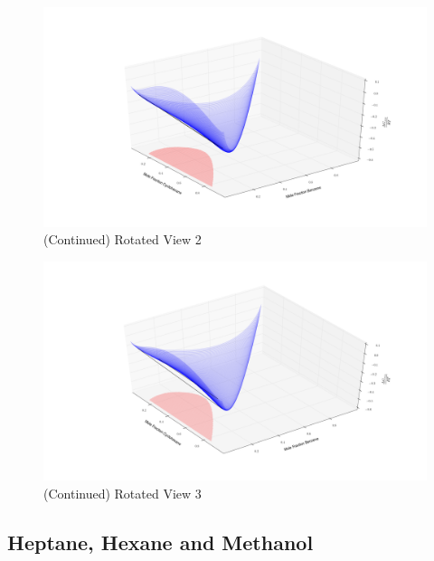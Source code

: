 \begin{figure}[hp]
\vspace{40pt}
\ContinuedFloat
\centering
\includegraphics[width = \textwidth, bb=100 100 1600 700]{Results_Parts/TernaryParams/cyclohexane-benzene-methanenitro/DWPM/rotation5.png}
\caption[]{(Continued) Rotated View 2}
\end{figure}

\begin{figure}[hp]
\vspace{40pt}
\ContinuedFloat
\centering
\includegraphics[width = \textwidth, bb=100 100 1600 700]{Results_Parts/TernaryParams/cyclohexane-benzene-methanenitro/DWPM/rotation6.png}
\caption[]{(Continued) Rotated View 3}
\end{figure}
\clearpage

\subsection{Heptane, Hexane and Methanol}

